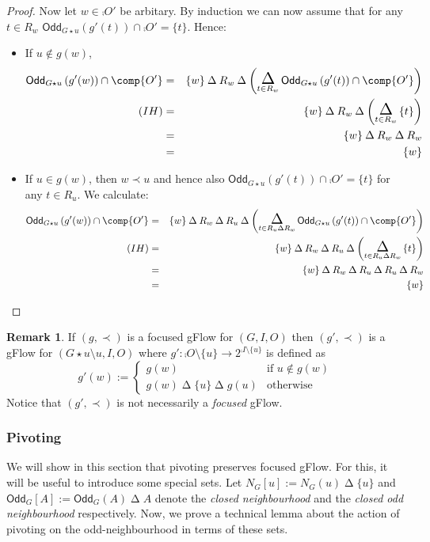 \documentclass[a4paper,onecolumn,superscriptaddress,11pt,accepted=2020-04-27]{quantumarticle}
\newcommand{\symd}{\mathbin{\Delta}\xspace}
\newcommand{\Symdi}[1]{\underset{\scriptstyle #1}{\scalebox{1.5}{$\symd$}}\,}
\newcommand{\odd}[2]{\textsf{Odd}_{#1}\left(#2\right)}
\newcommand{\codd}[2]{\textsf{Odd}_{#1}\left[#2\right]}
\theoremstyle{definition}
\newtheorem{remark}[theorem]{Remark}
\begin{document}
\begin{proof}
Now let $w\in \comp{O'}$ be arbitary. By induction we can now assume that for any $t\in R_w$ $\odd {G\star u}{g'(t)} \cap \comp{O'} = \{t\}$. Hence:
\begin{itemize}
\item If $u\notin g(w)$, 
\begin{eqnarray*}
\odd {G\star u}{g'(w)}\cap \comp{O'}& =& \{w\}\symd R_w \symd \left(\Symdi{t\in R_w}\odd {G\star u}{g'(t)} \cap \comp{O'} \right) \\
(IH)& = & \{w\}\symd R_w \symd \left( \Symdi{t\in R_w} \{t\} \right) \\
&=& \{w\}\symd R_w\symd R_w\\
&=&\{w\}
\end{eqnarray*} 

\item If $u\in g(w)$, then $w\prec u$ and hence also $\odd {G\star u}{g'(t)} \cap \comp{O'} = \{t\}$ for any $t\in R_u$. We calculate:
\begin{eqnarray*}
\odd {G\star u}{g'(w)}\cap \comp{O'}& =& \{w\}\symd R_w\symd R_u \symd \left(\Symdi{t\in R_u\symd R_w}\odd {G\star u}{g'(t)} \cap \comp{O'} \right) \\
(IH)& = & \{w\}\symd R_w\symd R_u \symd \left( \Symdi{t\in R_u\symd R_w} \{t\} \right) \\
&=& \{w\}\symd R_w\symd R_u\symd R_u\symd R_w\\
&=&\{w\}
\end{eqnarray*} 
\end{itemize}
\end{proof}

\begin{remark}
If $(g,\prec)$ is a focused gFlow for $(G,I,O)$ then $(g',\prec)$ is a gFlow for $(G\star u\setminus u,I,O)$ where $g':\comp O\setminus \{u\} \to 2^{\comp I\setminus \{u\}}$ is  defined as $$g'(w):=\begin{cases}g(w)& \text{if $u\notin  g(w)$}\\ g(w)\symd \{u\}\symd g(u)   &\text{otherwise}\end{cases}$$
Notice that $(g',\prec)$ is not necessarily a \emph{focused} gFlow. 
\end{remark}

\subsubsection{Pivoting}
\label{sec:proofPivot}

We will show in this section that pivoting preserves focused gFlow. For this, it will be useful to introduce some special sets. Let $N_G[u] := N_G(u)\symd \{u\}$ and $\codd G A := \odd  G A \symd A$ denote the \emph{closed neighbourhood} and the \emph{closed odd neighbourhood} respectively. Now, we prove a technical lemma about the action of pivoting on the odd-neighbourhood in terms of these sets.
\end{document}

